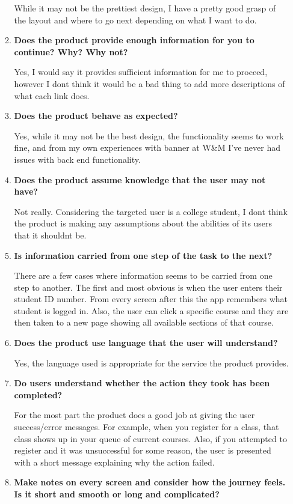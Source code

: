 \documentclass[11pt]{article}
\begin{document}
\begin{enumerate}[a)]
\begin{enumerate}[1)]
While it may not be the prettiest design, I have a pretty good grasp of the layout and where to go next depending on what I want to do.
\item \textbf{Does the product provide enough information for you to continue? Why? Why not?}

Yes, I would say it provides sufficient information for me to proceed, however I don\textquotesingle t think it would be a bad thing to add more descriptions of what each link does.  
\item \textbf{Does the product behave as expected?}

Yes, while it may not be the best design, the functionality seems to work fine, and from my own experiences with banner at W\&M I've never had issues with back end functionality.  
\item \textbf{Does the product assume knowledge that the user may not have?}

Not really.  Considering the targeted user is a college student, I don\textquotesingle t think the product is making any assumptions about the abilities of its users that it shouldn\textquotesingle t be.  
\item \textbf{Is information carried from one step of the task to the next?}

There are a few cases where information seems to be carried from one step to another.  The first and most obvious is when the user enters their student ID number.  From every screen after this the app remembers what student is logged in.  Also, the user can click a specific course and they are then taken to a new page showing all available sections of that course.  
\item \textbf{Does the product use language that the user will understand?}

Yes, the language used is appropriate for the service the product provides.  
\item \textbf{Do users understand whether the action they took has been completed?}

For the most part the product does a good job at giving the user success/error messages.  For example, when you register for a class, that class shows up in your queue of current courses.  Also, if you attempted to register and it was unsuccessful for some reason, the user is presented with a short message explaining why the action failed.  
\item \textbf{Make notes on every screen and consider how the journey feels. Is it short and smooth or 
long and complicated?}


\end{enumerate}
\end{enumerate}
\end{document}
